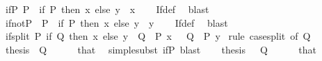 \begin{isabellebody}
%
\endisadelimproof
\isanewline
{}\isamarkupfalse%
\ if{\isacharunderscore}{\kern0pt}P{\isacharcolon}{\kern0pt}\ {\isachardoublequoteopen}P\ {\isasymLongrightarrow}\ {\isacharparenleft}{\kern0pt}if\ P\ then\ x\ else\ y{\isacharparenright}{\kern0pt}\ {\isacharequal}{\kern0pt}\ x{\isachardoublequoteclose}\isanewline
%
\isadelimproof
\ \ %
\endisadelimproof
%
\isatagproof
{}\isamarkupfalse%
\ If{\isacharunderscore}{\kern0pt}def\ \isamarkupfalse%
\ blast%
\endisatagproof
{\isafoldproof}%
%
\isadelimproof
\isanewline
%
\endisadelimproof
\isanewline
{}\isamarkupfalse%
\ if{\isacharunderscore}{\kern0pt}not{\isacharunderscore}{\kern0pt}P{\isacharcolon}{\kern0pt}\ {\isachardoublequoteopen}{\isasymnot}\ P\ {\isasymLongrightarrow}\ {\isacharparenleft}{\kern0pt}if\ P\ then\ x\ else\ y{\isacharparenright}{\kern0pt}\ {\isacharequal}{\kern0pt}\ y{\isachardoublequoteclose}\isanewline
%
\isadelimproof
\ \ %
\endisadelimproof
%
\isatagproof
{}\isamarkupfalse%
\ If{\isacharunderscore}{\kern0pt}def\ \isamarkupfalse%
\ blast%
\endisatagproof
{\isafoldproof}%
%
\isadelimproof
\isanewline
%
\endisadelimproof
\isanewline
{}\isamarkupfalse%
\ if{\isacharunderscore}{\kern0pt}split{\isacharcolon}{\kern0pt}\ {\isachardoublequoteopen}P\ {\isacharparenleft}{\kern0pt}if\ Q\ then\ x\ else\ y{\isacharparenright}{\kern0pt}\ {\isacharequal}{\kern0pt}\ {\isacharparenleft}{\kern0pt}{\isacharparenleft}{\kern0pt}Q\ {\isasymlongrightarrow}\ P\ x{\isacharparenright}{\kern0pt}\ {\isasymand}\ {\isacharparenleft}{\kern0pt}{\isasymnot}\ Q\ {\isasymlongrightarrow}\ P\ y{\isacharparenright}{\kern0pt}{\isacharparenright}{\kern0pt}{\isachardoublequoteclose}\isanewline
%
\isadelimproof
%
\endisadelimproof
%
\isatagproof
{}\isamarkupfalse%
\ {\isacharparenleft}{\kern0pt}rule\ case{\isacharunderscore}{\kern0pt}split\ {\isacharbrackleft}{\kern0pt}of\ Q{\isacharbrackright}{\kern0pt}{\isacharparenright}{\kern0pt}\isanewline
\ \ \isamarkupfalse%
\ {\isacharquery}{\kern0pt}thesis\ \ Q\isanewline
\ \ \ \ \isamarkupfalse%
\ that\ \isamarkupfalse%
\ {\isacharparenleft}{\kern0pt}simplesubst\ if{\isacharunderscore}{\kern0pt}P{\isacharparenright}{\kern0pt}\ blast{\isacharplus}{\kern0pt}\isanewline
\ \ \isamarkupfalse%
\ {\isacharquery}{\kern0pt}thesis\ \ {\isachardoublequoteopen}{\isasymnot}\ Q{\isachardoublequoteclose}\isanewline
\ \ \ \ \isamarkupfalse%
\ that\ \isamarkupfalse%

\end{isabellebody}
